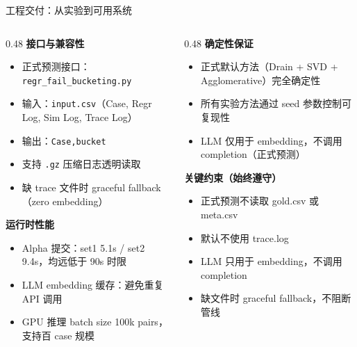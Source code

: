 \documentclass[aspectratio=169,UTF8]{ctexbeamer}
\begin{document}
\begin{frame}{工程交付：从实验到可用系统}
  \small
  \begin{columns}[T]
    \begin{column}{0.48\textwidth}
      \textbf{接口与兼容性}
      \begin{itemize}
        \item 正式预测接口：\texttt{regr\_fail\_bucketing.py}
        \item 输入：\texttt{input.csv}（Case, Regr Log, Sim Log, Trace Log）
        \item 输出：\texttt{Case,bucket}
        \item 支持 \texttt{.gz} 压缩日志透明读取
        \item 缺 trace 文件时 graceful fallback（zero embedding）
      \end{itemize}
      \vspace{2mm}
      \textbf{运行时性能}
      \begin{itemize}
        \item Alpha 提交：set1 5.1s / set2 9.4s，均远低于 90s 时限
        \item LLM embedding 缓存：避免重复 API 调用
        \item GPU 推理 batch size 100k pairs，支持百 case 规模
      \end{itemize}
    \end{column}
    \begin{column}{0.48\textwidth}
      \textbf{确定性保证}
      \begin{itemize}
        \item 正式默认方法（Drain + SVD + Agglomerative）完全确定性
        \item 所有实验方法通过 seed 参数控制可复现性
        \item LLM 仅用于 embedding，不调用 completion（正式预测）
      \end{itemize}
      \vspace{2mm}
      \textbf{关键约束（始终遵守）}
      \begin{itemize}
        \item 正式预测不读取 gold.csv 或 meta.csv
        \item 默认不使用 trace.log
        \item LLM 只用于 embedding，不调用 completion
        \item 缺文件时 graceful fallback，不阻断管线
      \end{itemize}
    \end{column}
  \end{columns}
\end{frame}
\end{document}
